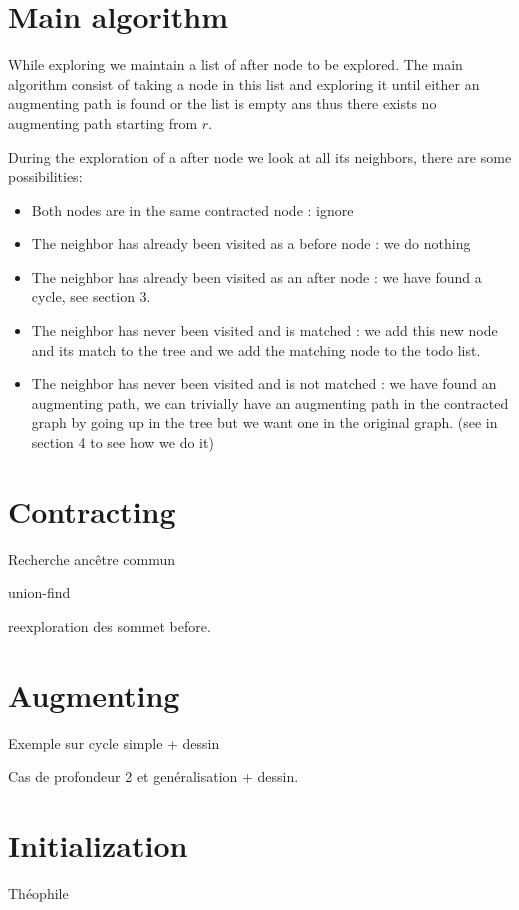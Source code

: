 \documentclass[a4paper,12pt]{article}
\renewcommand{\(}{\left(}
\renewcommand{\)}{\right)}
\begin{document}
\section{Main algorithm}

While exploring we maintain a list of after node to be explored. The main
algorithm consist of taking a node in this list and exploring it until either an
augmenting path is found or the list is empty ans thus there exists no
augmenting path starting from $r$.


During the exploration of a after node we look at all its neighbors, there are
some possibilities:
\begin{itemize}
\item Both nodes are in the same contracted node : ignore
\item The neighbor has already been visited as a before node : we do nothing
\item The neighbor has already been visited as an after node : we have found a
  cycle, see section 3.
\item The neighbor has never been visited and is matched : we add this new node
  and its match to the tree and we add the matching node to the todo list.
\item The neighbor has never been visited and is not matched : we have found an
  augmenting path, we can trivially have an augmenting path in the contracted
  graph by going up in the tree but we want one in the original graph. (see in
  section 4 to see how we do it)
\end{itemize}



\section{Contracting}

Recherche ancêtre commun

union-find

reexploration des sommet before.

\section{Augmenting}

Exemple sur cycle simple + dessin

Cas de profondeur 2 et genéralisation + dessin.

\section{Initialization}

Théophile
\end{document}
